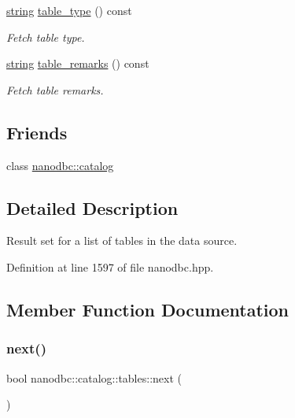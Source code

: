 \begin{DoxyCompactItemize}
\mbox{\hyperlink{namespacenanodbc_abfc0ece56278e590911ec8352774c212}{string}} \mbox{\hyperlink{classnanodbc_1_1catalog_1_1tables_adb13cff21e59c6f534ee426d5b35ddd0}{table\+\_\+type}} () const
\begin{DoxyCompactList}\small\item\em Fetch table type. \end{DoxyCompactList}\item 
\mbox{\hyperlink{namespacenanodbc_abfc0ece56278e590911ec8352774c212}{string}} \mbox{\hyperlink{classnanodbc_1_1catalog_1_1tables_aceecf984de3a6cec736b2cf68f656042}{table\+\_\+remarks}} () const
\begin{DoxyCompactList}\small\item\em Fetch table remarks. \end{DoxyCompactList}\end{DoxyCompactItemize}
\subsection*{Friends}
\begin{DoxyCompactItemize}
\item 
class \mbox{\hyperlink{classnanodbc_1_1catalog_1_1tables_af0f3134c7f6f1f36bfe1e247318dfe43}{nanodbc\+::catalog}}
\end{DoxyCompactItemize}


\subsection{Detailed Description}
Result set for a list of tables in the data source. 

Definition at line 1597 of file nanodbc.\+hpp.



\subsection{Member Function Documentation}
\mbox{\label{classnanodbc_1_1catalog_1_1tables_a5315f75223a7ce90b4fcff38e03ee355}} 
\subsubsection{\texorpdfstring{next()}{next()}}
{\footnotesize\ttfamily bool nanodbc\+::catalog\+::tables\+::next (\begin{DoxyParamCaption}{ }\end{DoxyParamCaption})}



